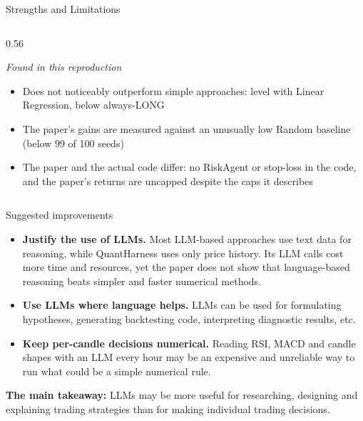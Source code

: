 \documentclass{beamer}
\begin{document}
\begin{frame}{Strengths and Limitations}
\begin{columns}[T, onlytextwidth]
\begin{column}{0.56\linewidth}
                \vspace{0.4em}
                {\scriptsize\textit{Found in this reproduction}\par}
                \begin{itemize}
                    \item Does not noticeably outperform simple approaches: level with Linear Regression, below always-LONG
                    \item The paper's gains are measured against an unusually low Random baseline (below 99 of 100 seeds)
                    \item The paper and the actual code differ: no RiskAgent or stop-loss in the code, and the paper's returns are uncapped despite the caps it describes
                \end{itemize}
            \end{column}
        \end{columns}
    \end{frame}

    \begin{frame}{Suggested improvements}
        \footnotesize
        \begin{itemize}
            \setlength{\itemsep}{0.9em}
            \item \textbf{Justify the use of LLMs.} Most LLM-based approaches use text data for reasoning, while QuantHarness uses only price history. Its LLM calls cost more time and resources, yet the paper does not show that language-based reasoning beats simpler and faster numerical methods.
            \item \textbf{Use LLMs where language helps.} LLMs can be used for formulating hypotheses, generating backtesting code, interpreting diagnostic results, etc.
            \item \textbf{Keep per-candle decisions numerical.} Reading RSI, MACD and candle shapes with an LLM every hour may be an expensive and unreliable way to run what could be a simple numerical rule.
        \end{itemize}

        \vspace{1.5em}
        \colorbox{blue!8}{\parbox{\dimexpr\linewidth-2\fboxsep}{\small\raggedright\vspace{0.3em}\textbf{The main takeaway:} LLMs may be more useful for researching, designing and explaining trading strategies than for making individual trading decisions.\vspace{0.3em}}}
    \end{frame}
\end{document}
